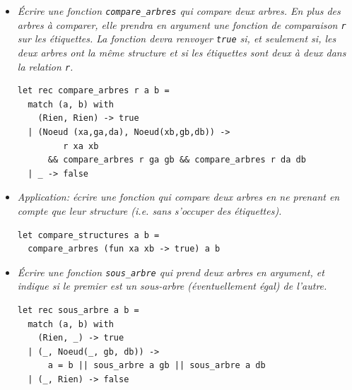 \documentclass[11pt, a4paper]{article}
\begin{document}
\begin{itemize}
        \smallskip

\begin{verbatim}
let rec préfixe = function
  Rien -> []
| Noeud(x, g, d) -> x :: ((préfixe g) @ (préfixe d))

let rec infixe = function
  Rien -> []
| Noeud(x, g, d) -> (infixe g) @ (x :: (infixe d))

let rec suffixe = function
  Rien -> []
| Noeud(x, g, d) -> (suffixe g) @ (suffixe d) @ [x]
\end{verbatim}

        \medskip

        Note: il est possible d'écrire les fonctions de parcours ({\tt
        préfixe}, {\tt infixe} et {\tt suffixe}) de façon plus
        efficace. Les versions ci-dessus présentent l'avantage d'être
        très lisibles.

  \item \emph{Écrire une fonction {\tt compare\_arbres} qui compare
        deux arbres. En plus des arbres à comparer, elle prendra en
        argument une fonction de comparaison {\tt r} sur les
        étiquettes. La fonction devra renvoyer {\tt true} si, et
        seulement si, les deux arbres ont la même structure et si les
        étiquettes sont deux à deux dans la relation {\tt r}.}

        \smallskip

        \begin{verbatim}
let rec compare_arbres r a b =
  match (a, b) with
    (Rien, Rien) -> true
  | (Noeud (xa,ga,da), Noeud(xb,gb,db)) ->
         r xa xb
      && compare_arbres r ga gb && compare_arbres r da db
  | _ -> false
\end{verbatim}

        \medskip

  \item \emph{Application: écrire une fonction qui compare deux arbres
        en ne prenant en compte que leur structure (i.e.  sans
        s'occuper des étiquettes).}

        \smallskip

\begin{verbatim}
let compare_structures a b =
  compare_arbres (fun xa xb -> true) a b
\end{verbatim}

        \smallskip

  \item \emph{Écrire une fonction {\tt sous\_arbre} qui prend deux
        arbres en argument, et indique si le premier est un sous-arbre
        (éventuellement égal) de l'autre.}

        \smallskip

\begin{verbatim}
let rec sous_arbre a b =
  match (a, b) with
    (Rien, _) -> true
  | (_, Noeud(_, gb, db)) ->
      a = b || sous_arbre a gb || sous_arbre a db
  | (_, Rien) -> false
\end{verbatim}

\end{itemize}
\end{document}
